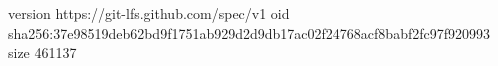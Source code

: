 version https://git-lfs.github.com/spec/v1
oid sha256:37e98519deb62bd9f1751ab929d2d9db17ac02f24768acf8babf2fc97f920993
size 461137
